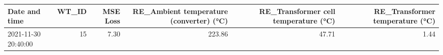 \begin{tabular}{lrrrrr}
\toprule
Date and time & WT\_ID & MSE Loss & RE\_Ambient temperature (converter) (°C) & RE\_Transformer cell temperature (°C) & RE\_Transformer temperature (°C) \\
\midrule
2021-11-30 20:40:00 & 15 & 7.30 & 223.86 & 47.71 & 1.44 \\
\bottomrule
\end{tabular}
